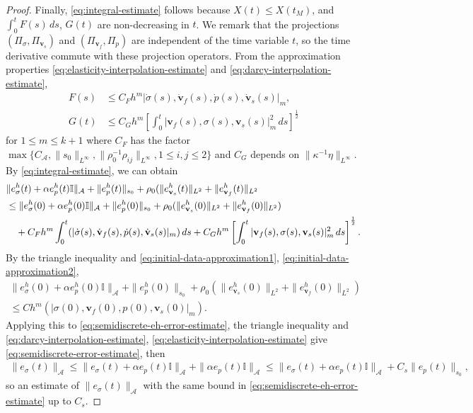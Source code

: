 \documentclass[10pt,letterpaper]{amsart}
\theoremstyle{plain} %
\theoremstyle{remark} %
\newcommand{\vect}[1]{\mathbf{#1}}
\newcommand{\Id}{\mathbb{I}} %
\newcommand{\Ael}{\mathcal{A}} %
\begin{document}
\begin{proof}
		Finally, \eqref{eq:integral-estimate} follows because $X(t) \le X(t_M)$, and $\int_0^t F(s)\,ds$, $G(t)$ are non-decreasing in $t$. 	
	We remark that the projections $(\Pi_{\sigma}, \Pi_{\vect{v}_{s}})$ and $(\Pi_{\vect{v}_{f}}, \Pi_{p})$ are independent of the time variable $t$, so the time derivative commute with these projection operators. 
	From the approximation properties \eqref{eq:elasticity-interpolation-estimate} and \eqref{eq:darcy-interpolation-estimate}, 
	\begin{align*}
		F(s) &\le C_F h^m | \dot{\sigma}(s), {\dot{\vect{v}}_{f}}(s), \dot{p}(s), \dot{\vect{v}}_{s}(s) |_{m} ,
		\\
		G(t) &\le C_G h^m \left[\int_0^t | \vect{v}_{f}(s), \sigma(s), \vect{v}_{s}(s)|_{m}^2 \,ds \right]^{\frac 12}
	\end{align*}
	for $1 \le m \le k+1$ where $C_{F}$ has the factor $\max\{C_{\Ael}, \|s_0\|_{L^{\infty}}, \|\rho_0^{-1} \rho_{ij}\|_{L^{\infty}}, 1\le i, j \le 2 \}$ and $C_{G}$ depends on $\|\kappa^{-1} \eta \|_{L^{\infty}}$. By \eqref{eq:integral-estimate}, we can obtain
	\begin{align}
		\label{eq:semidiscrete-eh-error-estimate}
		&\| e_{\sigma}^{h} (t) + \alpha e_{p}^{h}(t)\Id \|_{\Ael} + \|e_{p}^{h}(t)\|_{s_0} + \rho_0 (\|e_{\vect{v}_{s}}^{h}(t)\|_{L^2} + \|e_{\vect{v}_{f}}^{h}(t)\|_{L^2} 
		\\
		\notag
		&\le \| e_{\sigma}^{h} (0) + \alpha e_{p}^{h}(0)\Id \|_{\Ael} + \|e_{p}^{h}(0)\|_{s_0} + \rho_0 (\|e_{\vect{v}_{s}}^{h}(0)\|_{L^2} + \|e_{\vect{v}_{f}}^{h}(0)\|_{L^2} )
		\\ 
		\notag
		&\quad + C_{F} h^m \int_0^t (| \dot{\sigma}(s), {\dot{\vect{v}}_{f}}(s), \dot{p}(s), \dot{\vect{v}}_{s}(s) |_{m}) \,ds + C_G h^m \left[\int_0^t | \vect{v}_{f}(s), \sigma(s), \vect{v}_{s}(s)|_{m}^2 \,ds \right]^{\frac 12} .
	\end{align}
	By the triangle inequality and \eqref{eq:initial-data-approximation1}, \eqref{eq:initial-data-approximation2}, 
	\begin{multline*}
		\| e_{\sigma}^{h} (0) + \alpha e_{p}^{h}(0)\Id \|_{\Ael} + \|e_{p}^{h}(0)\|_{s_0} + \rho_0 (\|e_{\vect{v}_{s}}^{h}(0)\|_{L^2} + \|e_{\vect{v}_{f}}^{h}(0)\|_{L^2} )
		\\
		\le C h^m (| \sigma(0), \vect{v}_{f}(0), p(0), \vect{v}_{s}(0)|_{m})  .
	\end{multline*}
	Applying this to  \eqref{eq:semidiscrete-eh-error-estimate}, the triangle inequality and \eqref{eq:darcy-interpolation-estimate}, \eqref{eq:elasticity-interpolation-estimate} give \eqref{eq:semidiscrete-error-estimate}, then 
	\begin{align*}
		\| e_{\sigma} (t) \|_{\Ael} \le \| e_{\sigma} (t) + \alpha e_{p}(t)\Id \|_{\Ael} + \| \alpha e_{p}(t)\Id \|_{\Ael} \le \| e_{\sigma} (t) + \alpha e_{p}(t)\Id \|_{\Ael} + C_s\| e_{p}(t) \|_{s_0},
	\end{align*}
	so an estimate of $\| e_{\sigma} (t) \|_{\Ael}$ with the same bound in \eqref{eq:semidiscrete-eh-error-estimate} up to $C_s$. 
\end{proof}
\end{document}
